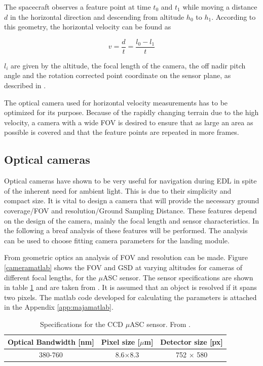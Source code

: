 The spacecraft observes a feature point at time $t_0$ and $t_1$ while moving a distance $d$ in the horizontal direction and descending from altitude $h_0$ to $h_1$. According to this geometry, the horizontal velocity can be found as

\begin{equation}
v=\dfrac{d}{t}=\dfrac{l_0-l_1}{t}
\end{equation}

$l_i$ are given by the altitude, the focal length of the camera, the off nadir pitch angle and the rotation corrected point coordinate on the sensor plane, as described in \cite{alessandro}.


The optical camera used for horizontal velocity measurements has to be optimized for its purpose. Because of the rapidly changing terrain due to the high velocity, a camera with a wide FOV is desired to ensure that as large an area as possible is covered and that the feature points are repeated in more frames.


 
\subsection{Optical cameras}

Optical cameras have shown to be very useful for navigation during EDL in spite of the inherent need for ambient light. This is due to their simplicity and compact size. It is vital to design a camera that will provide the necessary ground coverage/FOV and resolution/Ground Sampling Distance. These features depend on the design of the camera, mainly the focal length and sensor characteristics. In the following a breaf analysis of these features will be performed. The analysis can be used to choose fitting camera parameters for the landing module. 

From geometric optics an analysis of FOV and resolution can be made. Figure \ref{cameramatlab} shows the FOV  and GSD at varying altitudes for cameras of different focal lengths, for the $\mu$ASC sensor. The sensor specifications are shown in table \ref{tab:ASC} and are taken from \cite{alessandro}. It is assumed that an object is resolved if it spans two pixels. The matlab code developed for calculating the parameters is attached in the Appendix \ref{app:majamatlab}.

\begin{table}[htb]
\begin{center}
\begin{tabular}{|c|c|c|}
\hline
Optical Bandwidth [nm] & Pixel size [$\mu$m] & Detector size [px]\\
\hline
380-760  & 8.6$\times $8.3 & 752 $\times$ 580 \\
\hline
\end{tabular}

\caption{Specifications for the CCD $\mu$ASC sensor. From \cite{alessandro}.}

\label{tab:ASC}
\end{center}
\end{table}

